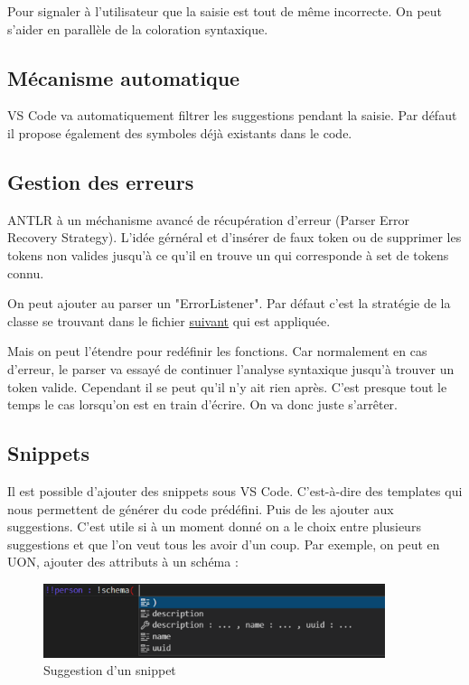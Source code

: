 \documentclass[
    iict, %
    il, %
]{heig-tb}
\begin{document}
Pour signaler à l'utilisateur que la saisie est tout de même incorrecte. On peut s'aider en parallèle de la coloration syntaxique.

\subsection{Mécanisme automatique}
VS Code va automatiquement filtrer les suggestions pendant la saisie.
Par défaut il propose également des symboles déjà existants dans le code.

\subsection{Gestion des erreurs }\label{error handle}

ANTLR à un méchanisme avancé de récupération d'erreur (Parser Error Recovery Strategy).
L'idée gérnéral et d'insérer de faux token ou de supprimer les tokens non valides jusqu'à ce qu'il en trouve un qui corresponde à set de tokens connu.


On peut ajouter au parser un "ErrorListener".
Par défaut c'est la stratégie de la classe se trouvant dans le fichier \href{https://github.com/tunnelvisionlabs/antlr4ts/blob/master/src/DefaultErrorStrategy.ts}{suivant} qui est appliquée.

Mais on peut l'étendre pour redéfinir les fonctions.
Car normalement en cas d'erreur, le parser va essayé de continuer l'analyse syntaxique jusqu'à trouver un token valide.
Cependant il se peut qu'il n'y ait rien après. C'est presque tout le temps le cas lorsqu'on est en train d'écrire.
On va donc juste s'arrêter.

\subsection{Snippets}
Il est possible d'ajouter des snippets sous VS Code. C'est-à-dire des templates qui nous permettent de générer du code prédéfini. Puis de les ajouter aux suggestions.
C'est utile si à un moment donné on a le choix entre plusieurs suggestions et que l'on veut tous les avoir d'un coup.
Par exemple, on peut en UON, ajouter des attributs à un schéma :

\begin{figure}[!h]
    \begin{center}
        \includegraphics[width=10cm]{assets/figures/snippet-suggestion.png}
    \end{center}
    \caption[Suggestion d'un snippet]{\label{snippet-suggestion} Suggestion d'un snippet}
\end{figure}
\end{document}
